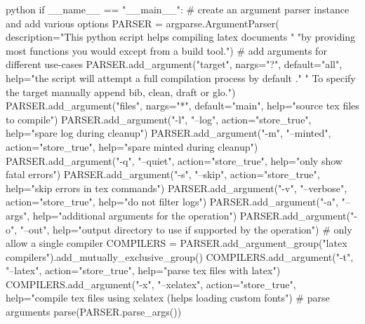 \documentclass[minted]{protocol}
\begin{document}
\begin{code}{python}
if __name__ == "__main__":
    # create an argument parser instance and add various options
    PARSER = argparse.ArgumentParser(
        description="This python script helps compiling latex documents "
                    "by providing most functions you would except from a build tool.")
    # add arguments for different use-cases
    PARSER.add_argument("target", nargs="?", default="all",
                        help="the script will attempt a full compilation process by default ."
                             " To specify the target manually append bib, clean, draft or glo.")
    PARSER.add_argument("files", nargs="*", default="main", help="source tex files to compile")
    PARSER.add_argument("-l", "--log", action="store_true", help="spare log during cleanup")
    PARSER.add_argument("-m", "--minted", action="store_true", help="spare minted during cleanup")
    PARSER.add_argument("-q", "--quiet", action="store_true", help="only show fatal errors")
    PARSER.add_argument("-s", "--skip", action="store_true", help="skip errors in tex commands")
    PARSER.add_argument("-v", "--verbose", action="store_true", help="do not filter logs")
    PARSER.add_argument("-a", "--args", help="additional arguments for the operation")
    PARSER.add_argument("-o", "--out", help="output directory to use if supported by the operation")
    # only allow a single compiler
    COMPILERS = PARSER.add_argument_group("latex compilers").add_mutually_exclusive_group()
    COMPILERS.add_argument("-t", "--latex", action="store_true", help="parse tex files with latex")
    COMPILERS.add_argument("-x", "--xelatex", action="store_true",
                           help="compile tex files using xelatex (helps loading custom fonts")
    # parse arguments
    parse(PARSER.parse_args())
\end{code}
\end{document}
